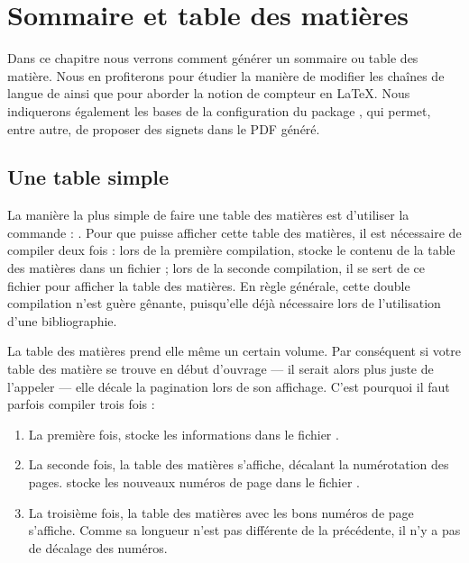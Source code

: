 \chapter{Sommaire et table des matières}\label{toc}

\begin{prealable}
Dans ce chapitre nous verrons comment générer un sommaire ou table des matière. Nous en profiterons pour étudier la manière de modifier les chaînes de langue de  ainsi que pour aborder la notion de compteur en \LaTeX{}. Nous indiquerons également les bases de la configuration du package , qui permet, entre autre, de proposer des signets dans le PDF généré.
\end{prealable}

\section{Une table simple}

La manière la plus simple de faire une table des matières est d'utiliser la commande : .
Pour que \XeLaTeX{} puisse afficher cette table des matières, il est nécessaire de compiler deux fois : lors de la première compilation, \XeLaTeX{} stocke le contenu de la table des matières dans un fichier  ; lors de la seconde compilation, il se sert de ce fichier pour afficher la table des matières. En règle générale, cette double compilation n'est guère gênante, puisqu'elle déjà nécessaire lors de l'utilisation d'une bibliographie.

\begin{attention}
La table des matières prend elle même un certain volume. Par conséquent si votre table des matière se trouve en début d'ouvrage --- il serait alors plus juste de l'appeler  --- elle décale la pagination lors de son affichage. C'est pourquoi il faut parfois compiler trois fois :

\begin{enumerate}
\item La première fois, \XeLaTeX{} stocke les informations dans le fichier .
\item La seconde fois, la table des matières  s'affiche, décalant la numérotation des pages. \XeLaTeX{}  stocke les nouveaux numéros de page  dans le fichier .
\item La troisième fois, la table des matières avec les bons numéros de page   s'affiche. Comme sa longueur n'est pas différente de la précédente, il n'y a pas de décalage des numéros.
\end{enumerate}

\end{attention}

